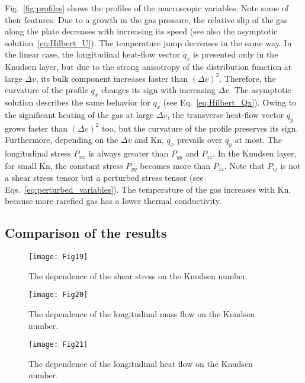 \documentclass[]{elsarticle} %
\newcommand{\Kn}{\mathrm{Kn}}
\begin{document}
Fig.~\ref{fig:profiles} shows the profiles of the macroscopic variables.
Note some of their features.
Due to a growth in the gas pressure, the relative slip of the gas along the plate decreases
with increasing its speed (see also the asymptotic solution~\eqref{eq:Hilbert_U}).
The temperature jump decreases in the same way.
In the linear case, the longitudinal heat-flow vector \(q_x\) is presented only in the Knudsen layer,
but due to the strong anisotropy of the distribution function at large \(\Delta{v}\),
its bulk component increases faster than \((\Delta{v})^2\).
Therefore, the curvature of the profile \(q_x\) changes its sign with increasing \(\Delta{v}\).
The asymptotic solution describes the same behavior for \(q_x\) (see Eq.~\eqref{eq:Hilbert_Qx}).
Owing to the significant heating of the gas at large \(\Delta{v}\),
the transverse heat-flow vector \(q_y\) grows faster than \((\Delta{v})^2\) too,
but the curvature of the profile preserves its sign.
Furthermore, depending on the \(\Delta{v}\) and \(\Kn\), \(q_x\) prevails over \(q_y\) at most.
The longitudinal stress \(P_{xx}\) is always greater than \(P_{yy}\) and \(P_{zz}\).
In the Knudsen layer, for small \(\Kn\), the constant stress \(P_{yy}\) becomes more than \(P_{zz}\).
Note that \(P_{ij}\) is not a shear stress tensor but a perturbed stress tensor
(see Eqs.~\eqref{eq:perturbed_variables}).
The temperature of the gas increases with \(\Kn\), because more rarefied gas
has a lower thermal conductivity.


\subsection{Comparison of the results}

\begin{figure}
    \centering
    \texttt{[image: Fig19]}
    \caption{The dependence of the shear stress on the Knudsen number.}
    \label{fig:shear}
\end{figure}

\begin{figure}
    \centering
    \texttt{[image: Fig20]}
    \caption{The dependence of the longitudinal mass flow on the Knudsen number.}
    \label{fig:flow}
\end{figure}

\begin{figure}
    \centering
    \texttt{[image: Fig21]}
    \caption{The dependence of the longitudinal heat flow on the Knudsen number.}
    \label{fig:qflow}
\end{figure}
\end{document}
